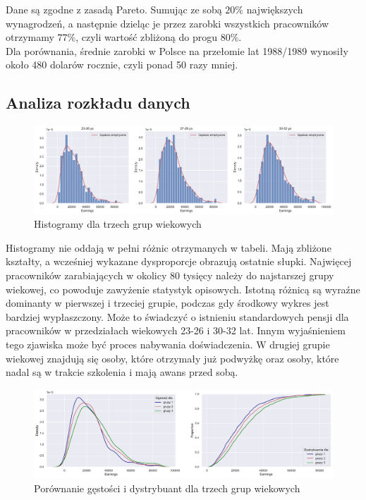 \documentclass[12pt]{mwart}
\begin{document}
\noindent Dane są zgodne z zasadą Pareto. Sumując ze sobą $20\%$ największych wynagrodzeń, a następnie dzieląc je przez zarobki wszystkich pracowników otrzymamy $77\%$, czyli wartość zbliżoną do progu $80\%$. \\ 


\noindent Dla porównania, średnie zarobki w Polsce na przełomie lat 1988/1989 wynosiły około 480 dolarów rocznie, czyli ponad 50 razy mniej.





\subsection{Analiza rozkładu danych}
\noindent

\begin{figure}[H]
	\begin{center}
	\includegraphics[scale=0.37]{histogramy1.pdf}
	\caption{Histogramy dla trzech grup wiekowych}
	\end{center}
\end{figure}

\noindent Histogramy nie oddają w pełni różnic otrzymanych w tabeli. Mają zbliżone kształty, a wcześniej wykazane dysproporcje obrazują ostatnie słupki. Najwięcej pracowników zarabiających w okolicy 80 tysięcy należy do najstarszej grupy wiekowej, co powoduje zawyżenie statystyk opisowych. Istotną różnicą są wyraźne dominanty w pierwszej i trzeciej grupie, podczas gdy środkowy wykres jest bardziej wypłaszczony. Może to świadczyć o istnieniu standardowych pensji dla pracowników w przedziałach wiekowych 23-26 i 30-32 lat. Innym wyjaśnieniem tego zjawiska może być proces nabywania doświadczenia. W drugiej grupie wiekowej znajdują się osoby, które otrzymały już podwyżkę oraz osoby, które nadal są w trakcie szkolenia i mają awans przed sobą.

\begin{figure}[H]
	\begin{center}
	\includegraphics[scale=0.37]{gd1.pdf}
	\caption{Porównanie gęstości i dystrybuant dla trzech grup wiekowych}
	\end{center}
\end{figure}
\end{document}
